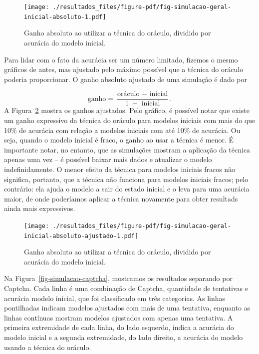 \documentclass[12pt,twoside,brazilian]{book}
\begin{document}
\begin{figure}

{\centering \texttt{[image: ./resultados\_files/figure-pdf/fig-simulacao-geral-inicial-absoluto-1.pdf]}

}

\caption{\label{fig-simulacao-geral-inicial-absoluto}Ganho absoluto ao
utilizar a técnica do oráculo, dividido por acurácia do modelo inicial.}

\end{figure}

Para lidar com o fato da acurácia ser um número limitado, fizemos o
mesmo gráficos de antes, mas ajustado pelo máximo possível que a técnica
do oráculo poderia proporcionar. O ganho absoluto ajustado de uma
simulação é dado por

\[
\text{ganho} = \frac{\text{oráculo } - \text{ inicial}}{1\; - \text{ inicial}}.
\] A Figura~\ref{fig-simulacao-geral-inicial-absoluto-ajustado} mostra
os ganhos ajustados. Pelo gráfico, é possível notar que existe um ganho
expressivo da técnica do oráculo para modelos iniciais com mais do que
10\% de acurácia com relação a modelos iniciais com até 10\% de
acurácia. Ou seja, quando o modelo inicial é fraco, o ganho ao usar a
técnica é menor. É importante notar, no entanto, que as simulações
mostram a aplicação da técnica apenas uma vez -- é possível baixar mais
dados e atualizar o modelo indefinidamente. O menor efeito da técnica
para modelos iniciais fracos não significa, portanto, que a técnica não
funciona para modelos iniciais fracos; pelo contrário: ela ajuda o
modelo a sair do estado inicial e o leva para uma acurácia maior, de
onde poderíamos aplicar a técnica novamente para obter resultads ainda
mais expressivos.

\begin{figure}

{\centering \texttt{[image: ./resultados\_files/figure-pdf/fig-simulacao-geral-inicial-absoluto-ajustado-1.pdf]}

}

\caption{\label{fig-simulacao-geral-inicial-absoluto-ajustado}Ganho
absoluto ao utilizar a técnica do oráculo, dividido por acurácia do
modelo inicial.}

\end{figure}

Na Figura~\ref{fig-simulacao-captcha}, mostramos os resultados separando
por Captcha. Cada linha é uma combinação de Captcha, quantidade de
tentativas e acurácia modelo inicial, que foi classificado em três
categorias. As linhas pontilhadas indicam modelos ajustados com mais de
uma tentativa, enquanto as linhas contínuas mostram modelos ajustados
com apenas uma tentativa. A primeira extremidade de cada linha, do lado
esquerdo, indica a acurácia do modelo inicial e a segunda extremidade,
do lado direito, a acurácia do modelo usando a técnica do oráculo.
\end{document}
